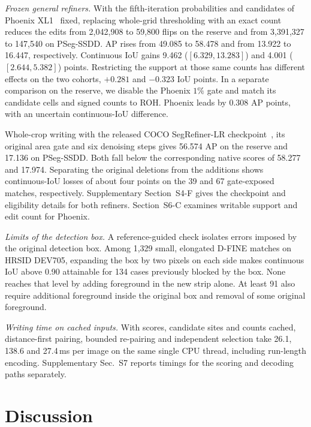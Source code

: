 \documentclass[journal]{IEEEtran}
\begin{document}
\textit{Frozen general refiners.}
With the fifth-iteration probabilities and candidates of Phoenix XL1~\cite{phoenix} fixed, replacing whole-grid thresholding with an exact count reduces the edits from 2,042,908 to 59,800 flips on the reserve and from 3,391,327 to 147,540 on PSeg-SSDD. AP rises from 49.085 to 58.478 and from 13.922 to 16.447, respectively. Continuous IoU gains 9.462 (\([6.329,13.283]\)) and 4.001 (\([2.644,5.382]\)) points. Restricting the support at those same counts has different effects on the two cohorts, \(+0.281\) and \(-0.323\) IoU points. In a separate comparison on the reserve, we disable the Phoenix \(1\%\) gate and match its candidate cells and signed counts to ROH. Phoenix leads by 0.308 AP points, with an uncertain continuous-IoU difference.

Whole-crop writing with the released COCO SegRefiner-LR checkpoint~\cite{segrefiner}, its original area gate and six denoising steps gives 56.574 AP on the reserve and 17.136 on PSeg-SSDD. Both fall below the corresponding native scores of 58.277 and 17.974. Separating the original deletions from the additions shows continuous-IoU losses of about four points on the 39 and 67 gate-exposed matches, respectively. Supplementary Section~S4-F gives the checkpoint and eligibility details for both refiners. Section~S6-C examines writable support and edit count for Phoenix.

\textit{Limits of the detection box.}
A reference-guided check isolates errors imposed by the original detection box. Among 1,329 small, elongated D-FINE matches on HRSID DEV705, expanding the box by two pixels on each side makes continuous IoU above 0.90 attainable for 134 cases previously blocked by the box. None reaches that level by adding foreground in the new strip alone. At least 91 also require additional foreground inside the original box and removal of some original foreground.

\textit{Writing time on cached inputs.}
With scores, candidate sites and counts cached, distance-first pairing, bounded re-pairing and independent selection take 26.1, 138.6 and 27.4\,ms per image on the same single CPU thread, including run-length encoding. Supplementary Sec.~S7 reports timings for the scoring and decoding paths separately.

\section{Discussion}
\label{sec:discussion}
\end{document}
